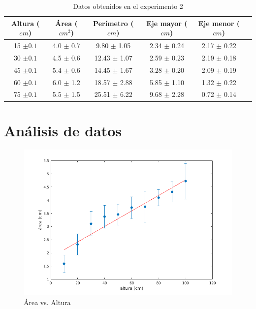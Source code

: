 \begin{table}[H] \centering \caption{Datos obtenidos en el experimento 2}
    \label{tab:proc2} \begin{tabular}{cccccc} \toprule Altura ($cm$) & Área
        ($cm^2$) & Perímetro ($cm$) & Eje mayor ($cm$) & Eje menor ($cm$) \\
        \midrule 15	$\pm0.1$ &	4.0	$\pm$	0.7	&	9.80	$\pm$	1.05	&
        2.34	$\pm$	0.24	&	2.17	$\pm$	0.22	\\ 30	$\pm0.1$ &
        4.5	$\pm$	0.6	&	12.43	$\pm$	1.07	&	2.59	$\pm$	0.23
                      &	2.19	$\pm$	0.18	\\ 45	$\pm0.1$ &	5.4	$\pm$
        0.6	&	14.45	$\pm$	1.67	&	3.28	$\pm$	0.20	&	2.09
        $\pm$	0.19	\\ 60	$\pm0.1$ &	6.0	$\pm$	1.2	&	18.57	$\pm$
        2.88	&	5.85	$\pm$	1.10	&	1.32	$\pm$	0.22	\\ 75
    $\pm0.1$ &	5.5	$\pm$	1.5	&	25.51	$\pm$	6.22	&	9.68	$\pm$
2.28	&	0.72	$\pm$	0.14	\\ \bottomrule \end{tabular} \end{table}



\pagebreak \section{Análisis de datos} \label{sec:analisis_de_datos}


\begin{figure}[H] \centering
\includegraphics[width=0.9\linewidth]{src/area_vs_height.png} \caption{Área vs.
Altura} \label{fig:area_altura} \end{figure}

